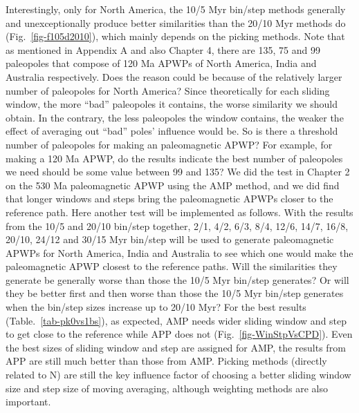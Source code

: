 Interestingly, only for North America, the 10/5 Myr bin/step methods generally
and unexceptionally produce better similarities than the 20/10 Myr methods do
(Fig.~\ref{fig-f105d2010}), which mainly depends on the picking methods. Note
that as mentioned in Appendix A and also Chapter 4, there are 135, 75 and 99
paleopoles that compose of 120 Ma APWPs of North America, India and
Australia respectively. Does the reason could be because of the relatively
larger number of paleopoles for North America? Since theoretically for each
sliding window, the more ``bad'' paleopoles it contains, the worse similarity
we should obtain. In the contrary, the less paleopoles the window contains, the
weaker the effect of averaging out ``bad'' poles' influence would be. So is
there a threshold number of paleopoles for making an paleomagnetic APWP\@? For
example, for making a 120 Ma APWP, do the results indicate the best
number of paleopoles we need should be some value between 99 and 135? We did
the test in Chapter 2 on the 530 Ma paleomagnetic APWP using the AMP
method, and we did find that longer windows and steps bring the paleomagnetic
APWPs closer to the reference path. Here another test will be implemented as
follows. With the results from the 10/5 and 20/10 bin/step together, 2/1, 4/2,
6/3, 8/4, 12/6, 14/7, 16/8, 20/10, 24/12 and 30/15 Myr bin/step will be used to
generate paleomagnetic APWPs for North America, India and Australia to see which
one would make the paleomagnetic APWP closest to the reference paths. Will the
similarities they generate be generally worse than those the 10/5 Myr bin/step
generates? Or will they be better first and then worse than those the 10/5 Myr
bin/step generates when the bin/step sizes increase up to 20/10 Myr? For the
best results (Table.~\ref{tab-pk0vs1bs}), as expected, AMP needs wider sliding
window and step to get close to the reference while APP does not
(Fig.~\ref{fig-WinStpVsCPD}). Even the best sizes of sliding window and step are
assigned for AMP, the results from APP are still much better than those from
AMP\@. Picking methods (directly related to N) are still the key influence
factor of choosing a better sliding window size and step size of moving
averaging, although weighting methods are also important.

